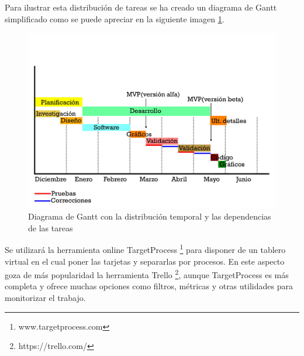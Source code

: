 Para ilustrar esta distribución de tareas se ha creado un diagrama de Gantt simplificado como se puede apreciar en la siguiente imagen \ref{gantt01}.

\begin{figure}
	\begin{center}
		\includegraphics[scale=0.6]{imagenes/GanttDiagram.jpg}
		\caption{Diagrama de Gantt con la distribución temporal y las dependencias de las tareas}
		\label{gantt01}
	\end{center}
\end{figure}

Se utilizará la herramienta online TargetProcess \footnote{www.targetprocess.com} para disponer de un tablero virtual  en el cual poner las tarjetas y separarlas por procesos. En este aspecto goza de más popularidad la herramienta Trello \footnote{https://trello.com/}, aunque TargetProcess es más completa y ofrece muchas opciones como filtros, métricas y otras utilidades para monitorizar el trabajo.



